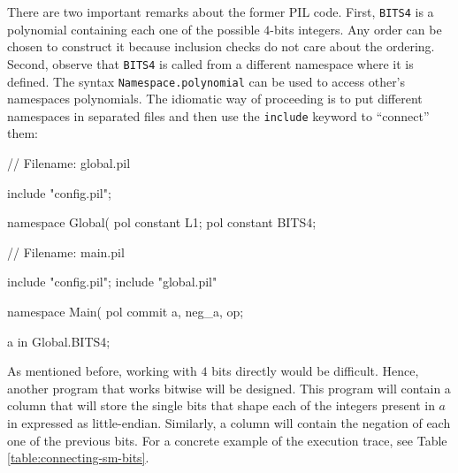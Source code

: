 There are two important remarks about the former PIL code. First, \texttt{BITS4} is a polynomial containing each one of the possible $4$-bits integers. Any order can be chosen to construct it because inclusion checks do not care about the ordering. Second, observe that \texttt{BITS4} is called from a different namespace where it is defined. The syntax \texttt{Namespace.polynomial} can be used to access other's namespaces polynomials. The idiomatic way of proceeding is to put different namespaces in separated files and then use the \texttt{include} keyword to ``connect'' them:
\begin{pil}
    // Filename: global.pil
    
    include "config.pil";
    
    namespace Global(%
    pol constant L1;
    pol constant BITS4;
\end{pil}

\begin{pil}
    // Filename: main.pil
    
    include "config.pil";
    include "global.pil"
    
    namespace Main(%
    pol commit a, neg_a, op;
    
    a in Global.BITS4;
\end{pil}

As mentioned before, working with $4$ bits directly would be difficult. Hence, another program that works bitwise will be designed. This program will contain a column \bits that will store the single bits that shape each of the integers present in $a$ in expressed as little-endian. Similarly, a column \nbits will contain the negation of each one of the previous bits. For a concrete example of the execution trace, see Table \ref{table:connecting-sm-bits}. 

